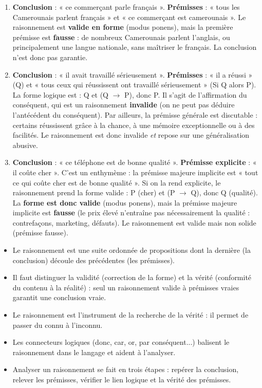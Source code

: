 \documentclass[11pt]{article}
\newcommand{\cle}[1]{{\popxbold\color{popdark}#1}}
\begin{document}
\begin{corrige}
\begin{enumerate}
\item \textbf{Conclusion} : « ce commerçant parle français ». \textbf{Prémisses} : « tous les Camerounais parlent français » et « ce commerçant est camerounais ». Le raisonnement est \textbf{valide en forme} (modus ponens), mais la première prémisse est \textbf{fausse} : de nombreux Camerounais parlent l'anglais, ou principalement une langue nationale, sans maîtriser le français. La conclusion n'est donc pas garantie.
\item \textbf{Conclusion} : « il avait travaillé sérieusement ». \textbf{Prémisses} : « il a réussi » (Q) et « tous ceux qui réussissent ont travaillé sérieusement » (Si Q alors P). La forme logique est : Q et (Q $\rightarrow$ P), donc P. Il s'agit de l'affirmation du conséquent, qui est un raisonnement \textbf{invalide} (on ne peut pas déduire l'antécédent du conséquent). Par ailleurs, la prémisse générale est discutable : certains réussissent grâce à la chance, à une mémoire exceptionnelle ou à des facilités. Le raisonnement est donc invalide \emph{et} repose sur une généralisation abusive.
\item \textbf{Conclusion} : « ce téléphone est de bonne qualité ». \textbf{Prémisse explicite} : « il coûte cher ». C'est un enthymème : la prémisse majeure implicite est « tout ce qui coûte cher est de bonne qualité ». Si on la rend explicite, le raisonnement prend la forme valide : P (cher) et (P $\rightarrow$ Q), donc Q (qualité). La \textbf{forme est donc valide} (modus ponens), mais la prémisse majeure implicite est \textbf{fausse} (le prix élevé n'entraîne pas nécessairement la qualité : contrefaçons, marketing, défauts). Le raisonnement est valide mais non solide (prémisse fausse).
\end{enumerate}
\end{corrige}

\begin{aretenir}
\begin{itemize}
\item Le \cle{raisonnement} est une suite ordonnée de propositions dont la dernière (la \cle{conclusion}) découle des précédentes (les \cle{prémisses}).
\item Il faut distinguer la \cle{validité} (correction de la forme) et la \cle{vérité} (conformité du contenu à la réalité) : seul un raisonnement valide à prémisses vraies garantit une conclusion vraie.
\item Le raisonnement est l'instrument de la recherche de la vérité : il permet de passer du connu à l'inconnu.
\item Les \cle{connecteurs logiques} (donc, car, or, par conséquent...) balisent le raisonnement dans le langage et aident à l'analyser.
\item Analyser un raisonnement se fait en trois étapes : repérer la conclusion, relever les prémisses, vérifier le lien logique et la vérité des prémisses.
\end{itemize}
\end{aretenir}
\end{document}
